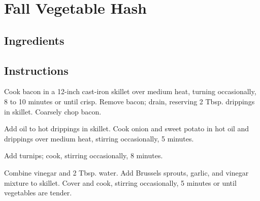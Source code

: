 \documentclass[ansiapaper,10pt,english]{sphinxmanual}
\begin{document}
\chapter{Fall Vegetable Hash}
\label{\detokenize{fall_veg_hash:fall-vegetable-hash}}\label{\detokenize{fall_veg_hash::doc}}

\section{Ingredients}
\label{\detokenize{fall_veg_hash:ingredients}}
%
\begin{sphinxVerbatim}[commandchars=\\\{\}]
   

   

   

   

  

    

     

   
\end{sphinxVerbatim}


\section{Instructions}
\label{\detokenize{fall_veg_hash:instructions}}
Cook bacon in a 12-inch cast-iron skillet over medium heat, turning occasionally, 8 to 10 minutes or until crisp. Remove bacon; drain, reserving 2 Tbsp. drippings in skillet. Coarsely chop bacon.

Add oil to hot drippings in skillet. Cook onion and sweet potato in hot oil and drippings over medium heat, stirring occasionally, 5 minutes.

Add turnips; cook, stirring occasionally, 8 minutes.

Combine vinegar and 2 Tbsp. water. Add Brussels sprouts, garlic, and vinegar mixture to skillet. Cover and cook, stirring occasionally, 5 minutes or until vegetables are tender.
\end{document}
